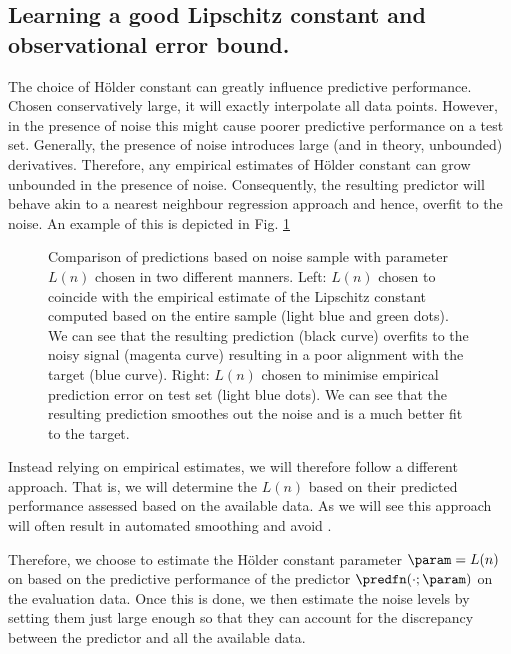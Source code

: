 \subsection{Learning a good Lipschitz constant and observational error bound.}
 
 The choice of H\"older constant can greatly influence predictive performance. Chosen conservatively large, it will exactly interpolate all data points. However, in the presence of noise this might cause poorer predictive performance on a test set. 
Generally, the presence of noise introduces large (and in theory, unbounded) derivatives. Therefore, any empirical estimates of H\"older constant can grow unbounded in the presence of noise. Consequently, the resulting predictor will behave akin to a nearest neighbour regression approach and hence, overfit to the noise. An example of this is depicted in Fig. \ref{fig:LACKInoise0}
\begin{figure}
        \centering
  \caption{Comparison of predictions based on noise sample with parameter $L(n)$ chosen in two different manners. Left: $L(n)$ chosen to coincide with the empirical estimate of the Lipschitz constant computed based on the entire sample (light blue and green dots). We can see that the resulting prediction (black curve) overfits to the noisy signal (magenta curve) resulting in a poor alignment with the target (blue curve). Right: $L(n)$ chosen to minimise empirical prediction error on test set (light blue dots). We can see that the resulting prediction smoothes out the noise and is a much better fit to the target.}
			\label{fig:LACKInoise0}
\end{figure}	


Instead relying on empirical estimates, we will therefore follow a different approach. That is, we will determine the $L(n)$ based on their predicted performance assessed based on the available data. As we will see this approach will often result in automated smoothing and avoid .


Therefore, we choose to estimate the H\"older constant parameter $\param = L(n)$ on based on the predictive performance of the predictor $\predfn(\cdot;\param)$ on the evaluation data.
Once this is done, we then estimate the noise levels by setting them just large enough so that they can account for the discrepancy between the predictor and all the available data.
 
